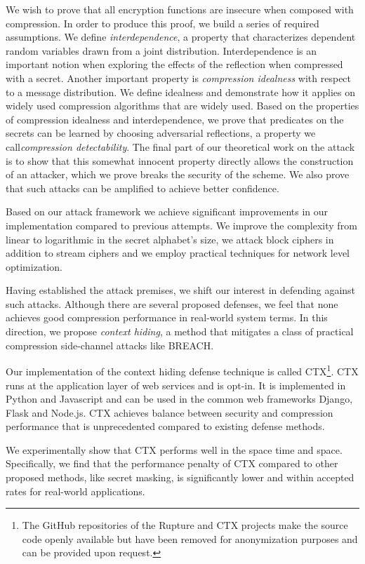 We wish to prove that all encryption functions are insecure when composed with
compression. In order to produce this proof, we build a series of required
assumptions. We define \textit{interdependence}, a property that characterizes
dependent random variables drawn from a joint distribution. Interdependence is
an important notion when exploring the effects of the reflection when compressed
with a secret.  Another important property is \textit{compression idealness}
with respect to a message distribution. We define idealness and demonstrate how
it applies on widely used compression algorithms that are widely used.  Based on
the properties of compression idealness and interdependence, we prove that
predicates on the secrets can be learned by choosing adversarial reflections, a
property we call\textit{compression detectability}. The final part of our
theoretical work on the attack is to show that this somewhat innocent property
directly allows the construction of an attacker, which we prove breaks the
security of the scheme. We also prove that such attacks can be amplified to
achieve better confidence.

Based on our attack framework we achieve significant improvements in our
implementation compared to previous attempts. We improve the complexity from
linear to logarithmic in the secret alphabet's size, we attack block ciphers in
addition to stream ciphers and we employ practical techniques for network level
optimization.

Having established the attack premises, we shift our interest in defending
against such attacks. Although there are several proposed defenses, we feel that
none achieves good compression performance in real-world system terms. In this
direction, we propose \textit{context hiding}, a method that mitigates a class
of practical compression side-channel attacks like BREACH.

Our implementation of the context hiding defense technique is called
CTX\footnote[1]{The GitHub repositories of the Rupture and CTX projects make the
source code openly available but have been removed for anonymization purposes
and can be provided upon request.}. CTX runs at the application layer of web
services and is opt-in. It is implemented in Python and Javascript and can be
used in the common web frameworks Django, Flask and Node.js. CTX achieves
balance between security and compression performance that is unprecedented
compared to existing defense methods.

We experimentally show that CTX performs well in the space time and space.
Specifically, we find that the performance penalty of CTX compared to other
proposed methods, like secret masking, is significantly lower and within
accepted rates for real-world applications.
